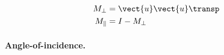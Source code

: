 \begin{subequations}
    \label{eq:para_perp_decomposition_matrix}
    \begin{align}
        M_\perp &= \vect{u} \vect{u}\transp
        \label{eq:perp_decomposition_matrix}
        \\
        M_\parallel & = I - M_\perp
        \label{eq:para_decomposition_matrix}
    \end{align}
\end{subequations}

\paragraph{Angle-of-incidence.}

